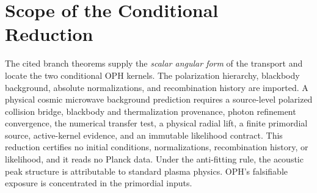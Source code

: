 \documentclass[11pt]{article}
\theoremstyle{remark}
\begin{document}
\section{Scope of the Conditional Reduction}
The cited branch theorems supply the \emph{scalar angular form} of the
transport and locate the two conditional OPH kernels. The polarization
hierarchy, blackbody background, absolute normalizations, and recombination
history are imported. A physical cosmic microwave background prediction
requires a source-level polarized collision bridge, blackbody and
thermalization provenance, photon refinement convergence, the numerical
transfer test, a physical radial lift, a finite primordial source,
active-kernel evidence, and an immutable likelihood contract. This reduction
certifies no initial conditions, normalizations, recombination history, or
likelihood, and it reads no Planck data. Under the anti-fitting rule, the
acoustic peak structure is attributable to standard plasma physics. OPH's
falsifiable exposure is concentrated in the primordial inputs.
\end{document}
